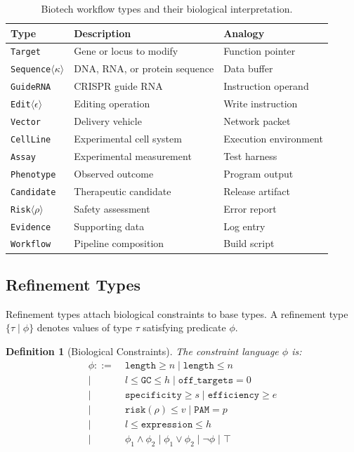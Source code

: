 \documentclass[12pt,a4paper]{article}
\newtheorem{definition}[theorem]{Definition}
\newcommand{\ty}[1]{\texttt{#1}}
\begin{document}
\begin{table}[H]
\centering
\caption{Biotech workflow types and their biological interpretation.}
\label{tab:workflow-types}
\begin{tabular}{lll}
\toprule
\textbf{Type} & \textbf{Description} & \textbf{Analogy} \\
\midrule
\ty{Target}              & Gene or locus to modify     & Function pointer \\
\ty{Sequence$\langle\kappa\rangle$} & DNA, RNA, or protein sequence & Data buffer \\
\ty{GuideRNA}            & CRISPR guide RNA            & Instruction operand \\
\ty{Edit$\langle\epsilon\rangle$}   & Editing operation           & Write instruction \\
\ty{Vector}              & Delivery vehicle            & Network packet \\
\ty{CellLine}            & Experimental cell system    & Execution environment \\
\ty{Assay}               & Experimental measurement    & Test harness \\
\ty{Phenotype}           & Observed outcome            & Program output \\
\ty{Candidate}           & Therapeutic candidate       & Release artifact \\
\ty{Risk$\langle\rho\rangle$}      & Safety assessment           & Error report \\
\ty{Evidence}            & Supporting data             & Log entry \\
\ty{Workflow}            & Pipeline composition        & Build script \\
\bottomrule
\end{tabular}
\end{table}

\subsection{Refinement Types}

Refinement types attach biological constraints to base types. A refinement type $\{\tau \mid \phi\}$ denotes values of type $\tau$ satisfying predicate $\phi$.

\begin{definition}[Biological Constraints]
The constraint language $\phi$ is:
\begin{align*}
\phi ::=\; & \texttt{length} \geq n \mid \texttt{length} \leq n \\
\mid\; & l \leq \texttt{GC} \leq h \mid \texttt{off\_targets} = 0 \\
\mid\; & \texttt{specificity} \geq s \mid \texttt{efficiency} \geq e \\
\mid\; & \texttt{risk}(\rho) \leq v \mid \texttt{PAM} = p \\
\mid\; & l \leq \texttt{expression} \leq h \\
\mid\; & \phi_1 \wedge \phi_2 \mid \phi_1 \vee \phi_2 \mid \neg \phi \mid \top
\end{align*}
\end{definition}
\end{document}
